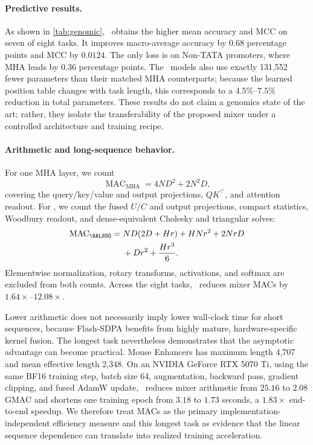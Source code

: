 \paragraph{Predictive results.}
As shown in \cref{tab:genomic}, \RRLSSO\ obtains the higher mean accuracy and
MCC on seven of eight tasks. It improves macro-average accuracy by $0.68$
percentage points and MCC by $0.0124$. The only loss is on Non-TATA promoters,
where MHA leads by $0.36$ percentage points. The \RRLSSO\ models also use
exactly 131,552 fewer parameters than their matched MHA counterparts; because
the learned position table changes with task length, this corresponds to a
$4.5\%$--$7.5\%$ reduction in total parameters. These results do not claim a
genomics state of the art; rather, they isolate the transferability of the
proposed mixer under a controlled architecture and training recipe.

\paragraph{Arithmetic and long-sequence behavior.}
For one MHA layer, we count
\begin{equation}
  \operatorname{MAC}_{\mathrm{MHA}}=4ND^2+2N^2D,
\end{equation}
covering the query/key/value and output projections, $QK^\top$, and attention
readout. For \RRLSSO, we count the fused $U/C$ and output projections, compact
statistics, Woodbury readout, and dense-equivalent Cholesky and triangular
solves:
\begin{align}
  \operatorname{MAC}_{\RRLSSO}
  ={}&ND(2D+Hr)+HNr^2+2NrD \notag\\
    &+Dr^2+\frac{Hr^3}{6}.
\end{align}
Elementwise normalization, rotary transforms, activations, and softmax are
excluded from both counts. Across the eight tasks, \RRLSSO\ reduces mixer MACs
by $1.64\times$--$12.08\times$.

Lower arithmetic does not necessarily imply lower wall-clock time for short
sequences, because Flash-SDPA benefits from highly mature, hardware-specific
kernel fusion. The longest task nevertheless demonstrates that the asymptotic
advantage can become practical. Mouse Enhancers has maximum length 4,707 and
mean effective length 2,348. On an NVIDIA GeForce RTX 5070 Ti, using the same
BF16 training step, batch size 64, augmentation, backward pass, gradient
clipping, and fused AdamW update, \RRLSSO\ reduces mixer arithmetic from
$25.16$ to $2.08$ GMAC and shortens one training epoch from $3.18$ to $1.73$
seconds, a $1.83\times$ end-to-end speedup. We therefore treat MACs as the
primary implementation-independent efficiency measure and this longest task as
evidence that the linear sequence dependence can translate into realized
training acceleration.
